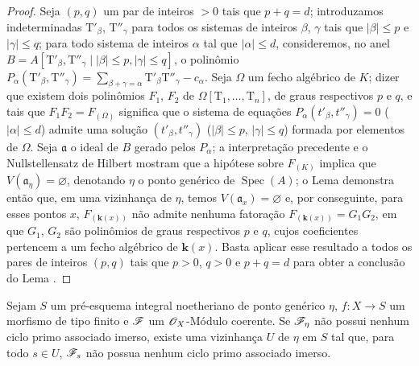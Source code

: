 \begin{proof}
Seja $(p,q)$ um par de inteiros $>0$ tais que $p+q=d$; introduzamos indeterminadas $\mathrm{T}'_\beta$, $\mathrm{T}''_\gamma$ para todos os sistemas de inteiros $\beta$, $\gamma$ tais que $|\beta|\leqslant p$ e $|\gamma|\leqslant q$; para todo sistema de inteiros $\alpha$ tal que $|\alpha|\leqslant d$, consideremos, no anel $B=A[\mathrm{T}'_\beta, \mathrm{T}''_\gamma \mid |\beta|\leqslant p, |\gamma|\leqslant q]$, o polinômio $P_\alpha(\mathrm{T}'_\beta,\mathrm{T}''_\gamma)=\sum_{\beta+\gamma=\alpha}\mathrm{T}'_\beta \mathrm{T}''_\gamma-c_\alpha$.
Seja $\Omega$ um fecho algébrico de $K$; dizer que existem dois polinômios $F_1$, $F_2$ de $\Omega[\mathrm{T}_1,\ldots,\mathrm{T}_n]$, de graus respectivos $p$ e $q$, e tais que $F_1F_2=F_{(\Omega)}$ significa que o sistema de equações $P_\alpha(t'_\beta,t''_\gamma)=0$ ($|\alpha|\leqslant d$) admite uma solução $(t'_\beta,t''_\gamma)$ ($|\beta|\leqslant p$, $|\gamma|\leqslant q$) formada por elementos de $\Omega$.
Seja $\mathfrak{a}$ o ideal de $B$ gerado pelos $P_\alpha$; a interpretação precedente e o Nullstellensatz de Hilbert mostram que a hipótese sobre $F_{(K)}$ implica que $V(\mathfrak{a}_\eta)=\varnothing$, denotando $\eta$ o ponto genérico de $\operatorname{Spec}(A)$; o Lema  demonstra então que, em uma vizinhança de $\eta$, temos $V(\mathfrak{a}_x)=\varnothing$ e, por conseguinte, para esses pontos $x$, $F_{(\boldsymbol{k}(x))}$ não admite nenhuma fatoração $F_{(\boldsymbol{k}(x))}=G_1G_2$, em que $G_1$, $G_2$ são polinômios de graus respectivos $p$ e $q$, cujos coeficientes pertencem a um fecho algébrico de $\boldsymbol{k}(x)$.
Basta aplicar esse resultado a todos os pares de inteiros $(p,q)$ tais que $p>0$, $q>0$ e $p+q=d$ para obter a conclusão do Lema .
\end{proof}

\begin{proposition}[9.7.6]
\label{IV.9.7.6}
Sejam $S$ um pré-esquema integral noetheriano de ponto genérico $\eta$, $f:X\to S$ um morfismo de tipo finito e $\mathscr{F}$ um $\mathscr{O}_X$-Módulo coerente.
Se $\mathscr{F}_\eta$ não possui nenhum ciclo primo associado imerso, existe uma vizinhança $U$ de $\eta$ em $S$ tal que, para todo $s\in U$, $\mathscr{F}_s$ não possua nenhum ciclo primo associado imerso.
\end{proposition}

